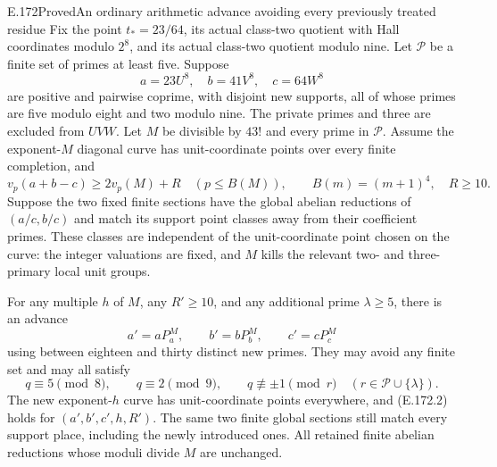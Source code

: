 \begin{result}{E.172}{Proved}{An ordinary arithmetic advance avoiding every previously treated residue}
Fix the point \(t_*=23/64\), its actual class-two quotient with
Hall coordinates modulo \(2^8\), and its actual class-two quotient
modulo nine. Let \(\mathcal P\) be a finite set of primes at
least five. Suppose
\[
 a=23U^8,\quad b=41V^8,\quad c=64W^8
 \tag{E.172.1}
\]
are positive and pairwise coprime, with disjoint new supports,
all of whose primes are five modulo eight and two modulo nine.
The private primes and three are excluded from \(UVW\).
Let \(M\) be divisible by \(43!\) and every prime in
\(\mathcal P\). Assume the exponent-\(M\) diagonal curve
has unit-coordinate points over every finite completion, and
\[
 v_p(a+b-c)\ge2v_p(M)+R
 \quad(p\le B(M)),\qquad B(m)=(m+1)^4,\quad R\ge10.
 \tag{E.172.2}
\]
Suppose the two fixed finite sections have the global abelian
reductions of \((a/c,b/c)\) and match its support point classes
away from their coefficient primes. These classes are independent
of the unit-coordinate point chosen on the curve: the integer
valuations are fixed, and \(M\) kills the relevant two- and
three-primary local unit groups.

For any multiple \(h\) of \(M\), any \(R'\ge10\), and any
additional prime \(\lambda\ge5\), there is an advance
\[
 a'=aP_a^M,\qquad b'=bP_b^M,\qquad c'=cP_c^M
 \tag{E.172.3}
\]
using between eighteen and thirty distinct new primes. They may
avoid any finite set and may all satisfy
\[
 q\equiv5\pmod8,\qquad q\equiv2\pmod9,
 \qquad q\not\equiv\pm1\pmod r
       \quad(r\in\mathcal P\cup\{\lambda\}).
 \tag{E.172.4}
\]
The new exponent-\(h\) curve has unit-coordinate points everywhere,
and (E.172.2) holds for \((a',b',c',h,R')\).
The same two finite global sections still match every support
place, including the newly introduced ones. All retained finite
abelian reductions whose moduli divide \(M\) are unchanged.
\end{result}
